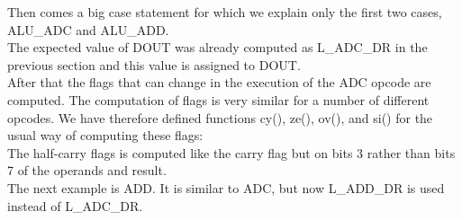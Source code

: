 \documentclass[12pt,a4paper]{report}
\begin{document}
Then comes a big case statement for which we explain only the first two cases, ALU\_ADC and ALU\_ADD.\\
The expected value of DOUT was already computed as L\_ADC\_DR in the previous section and this value is assigned to DOUT.\\
After that the flags that can change in the execution of the ADC opcode are computed. The computation of flags is very similar for a number of different opcodes. We have therefore defined functions cy(), ze(), ov(), and si() for the usual way of computing these flags:\\
The half-carry flags is computed like the carry flag but on bits 3 rather than bits 7 of the operands and result.\\
The next example is ADD. It is similar to ADC, but now L\_ADD\_DR is used instead of L\_ADC\_DR.\\
\end{document}
